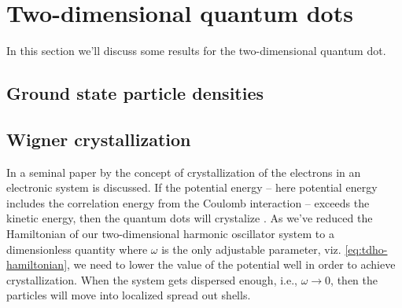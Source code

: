 \section{Two-dimensional quantum dots}
    In this section we'll discuss some results for the two-dimensional quantum
    dot.

    \subsection{Ground state particle densities}


    \subsection{Wigner crystallization}
        In a seminal paper by \citeauthor{wigner-crystal}
        \cite{wigner-crystal} the concept of crystallization of the electrons in
        an electronic system is discussed.
        If the potential energy -- here potential energy includes the
        correlation energy from the Coulomb interaction -- exceeds the kinetic
        energy, then the quantum dots will crystalize
        \cite{hogberget2013quantum}.
        As we've reduced the Hamiltonian of our two-dimensional harmonic
        oscillator system to a dimensionless quantity where $\omega$ is the only
        adjustable parameter, viz. \autoref{eq:tdho-hamiltonian}, we need to
        lower the value of the potential well in order to achieve
        crystallization.
        When the system gets dispersed enough, i.e., $\omega \to 0$, then the
        particles will move into localized spread out shells.

